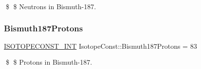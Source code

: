 \$ \$ Neutrons in Bismuth-\/187. \mbox{\label{group___isotope_const-_bismuth-_bi187_ga8c23acebd2507c6d5f99ab06dd7536f1}} 
\subsubsection{\texorpdfstring{Bismuth187\+Protons}{Bismuth187Protons}}
{\footnotesize\ttfamily \mbox{\hyperlink{group___isotope_const-_macros_ga5f18360b3e99483a35c32d789e62621c}{I\+S\+O\+T\+O\+P\+E\+C\+O\+N\+S\+T\+\_\+\+I\+NT}} Isotope\+Const\+::\+Bismuth187\+Protons = 83}

\$ \$ Protons in Bismuth-\/187. 